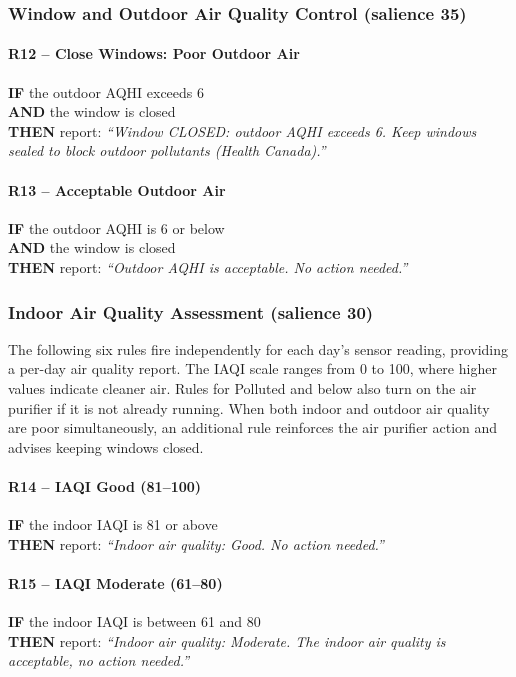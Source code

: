 \documentclass{article}
\begin{document}
\subsubsection{Window and Outdoor Air Quality Control \textnormal{\small(salience 35)}}

\paragraph{R12 -- Close Windows: Poor Outdoor Air}
\textbf{IF} the outdoor AQHI exceeds 6 \\
\textbf{AND} the window is closed \\
\textbf{THEN} report: \textit{``Window CLOSED: outdoor AQHI exceeds 6. Keep windows sealed to block outdoor pollutants (Health Canada).''}

\paragraph{R13 -- Acceptable Outdoor Air}
\textbf{IF} the outdoor AQHI is 6 or below \\
\textbf{AND} the window is closed \\
\textbf{THEN} report: \textit{``Outdoor AQHI is acceptable. No action needed.''}

\subsubsection{Indoor Air Quality Assessment \textnormal{\small(salience 30)}}

The following six rules fire independently for each day's sensor reading, providing a per-day air quality report. The IAQI scale ranges from 0 to 100, where higher values indicate cleaner air. Rules for Polluted and below also turn on the air purifier if it is not already running. When both indoor and outdoor air quality are poor simultaneously, an additional rule reinforces the air purifier action and advises keeping windows closed.

\paragraph{R14 -- IAQI Good (81--100)}
\textbf{IF} the indoor IAQI is 81 or above \\
\textbf{THEN} report: \textit{``Indoor air quality: Good. No action needed.''}

\paragraph{R15 -- IAQI Moderate (61--80)}
\textbf{IF} the indoor IAQI is between 61 and 80 \\
\textbf{THEN} report: \textit{``Indoor air quality: Moderate. The indoor air quality is acceptable, no action needed.''}
\end{document}
